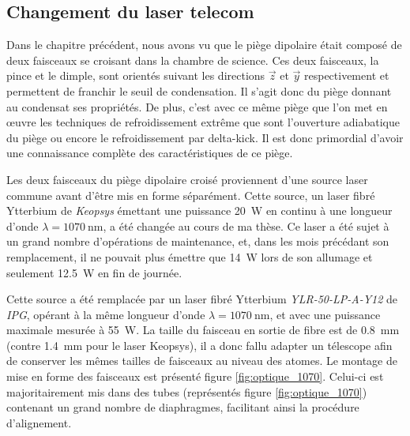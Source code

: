 \subsection{Changement du laser telecom}
Dans le chapitre précédent, nous avons vu que le piège dipolaire était composé de deux faisceaux se croisant dans la chambre de science. Ces deux faisceaux, la pince et le dimple, sont orientés suivant les directions $\vec{z}$ et $\vec{y}$ respectivement et permettent de franchir le seuil de condensation. Il s'agit donc du piège donnant au condensat ses propriétés. De plus, c'est avec ce même piège que l'on met en œuvre les techniques de refroidissement extrême que sont l'ouverture adiabatique du piège ou encore le refroidissement par delta-kick. Il est donc primordial d'avoir une connaissance complète des caractéristiques de ce piège.

Les deux faisceaux du piège dipolaire croisé proviennent d'une source laser commune avant d'être mis en forme séparément. Cette source, un laser fibré Ytterbium de \emph{Keopsys} émettant une puissance \SI{20}{\watt} en continu à une longueur d'onde $\lambda=\SI{1070}{\nano\metre}$, a été changée au cours de ma thèse. Ce laser a été sujet à un grand nombre d'opérations de maintenance, et, dans les mois précédant son remplacement, il ne pouvait plus émettre que \SI{14}{\watt} lors de son allumage et seulement \SI{12.5}{\watt} en fin de journée.
 
Cette source a été remplacée par un laser fibré Ytterbium \emph{YLR-50-LP-A-Y12} de \emph{IPG}, opérant à la même longueur d'onde $\lambda=\SI{1070}{\nano\metre}$, et avec une puissance maximale mesurée à \SI{55}{\watt}. La taille du faisceau en sortie de fibre est de \SI{0.8}{\milli\metre} (contre \SI{1.4}{\milli\metre} pour le laser Keopsys), il a donc fallu adapter un télescope afin de conserver les mêmes tailles de faisceaux au niveau des atomes. Le montage de mise en forme des faisceaux est présenté figure \ref{fig:optique_1070}. Celui-ci est majoritairement mis dans des tubes (représentés figure \ref{fig:optique_1070}) contenant un grand nombre de diaphragmes, facilitant ainsi la procédure d'alignement.

